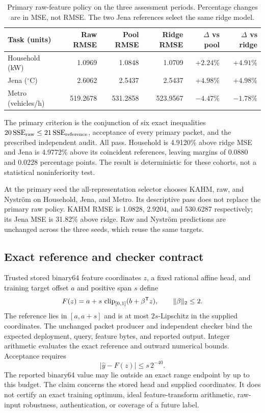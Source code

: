 \begin{table}[htbp]
\centering\small
\begin{tabular}{@{}lrrrrr@{}}
\toprule
Task (units) & Raw RMSE & Pool RMSE & Ridge RMSE & $\Delta$ vs pool & $\Delta$ vs ridge\\
\midrule
Household (kW) & 1.0969 & 1.0848 & 1.0709 & $+2.24\%$ & $+4.91\%$\\
Jena ($ {}^\circ$C) & 2.6062 & 2.5437 & 2.5437 & $+4.98\%$ & $+4.98\%$\\
Metro (vehicles/h) & 519.2678 & 531.2858 & 523.9567 & $-4.47\%$ & $-1.78\%$\\
\bottomrule
\end{tabular}
\caption{Primary raw-feature policy on the three assessment periods. Percentage changes are in MSE, not RMSE. The two Jena references select the same ridge model.}
\label{tab:accuracy}
\end{table}

The primary criterion is the conjunction of six exact inequalities
$20\,\mathrm{SSE}_{\rm raw}\leq21\,\mathrm{SSE}_{\rm reference}$,
acceptance of every primary packet, and the prescribed independent audit. All pass. Household is 4.9120\% above ridge MSE and Jena is 4.9772\% above its coincident references, leaving margins of 0.0880 and 0.0228 percentage points. The result is deterministic for these cohorts, not a statistical noninferiority test.

At the primary seed the all-representation selector chooses KAHM, raw, and Nystr\"om on Household, Jena, and Metro. Its descriptive pass does not replace the primary raw policy. KAHM RMSE is 1.0828, 2.9204, and 530.6287 respectively; its Jena MSE is 31.82\% above ridge. Raw and Nystr\"om predictions are unchanged across the three seeds, which reuse the same targets.

\subsection{Exact reference and checker contract}
Trusted stored binary64 feature coordinates $z$, a fixed rational affine head, and training target offset $a$ and positive span $s$ define
\[
F(z)=a+s\,\operatorname{clip}_{[0,1]}(b+\beta^{\mathsf T}z),
\qquad \|\beta\|_2\leq2.
\]
The reference lies in $[a,a+s]$ and is at most $2s$-Lipschitz in the supplied coordinates. The unchanged packet producer and independent checker bind the expected deployment, query, feature bytes, and reported output. Integer arithmetic evaluates the exact reference and outward numerical bounds. Acceptance requires
\[
|\widehat y-F(z)|\leq s\,2^{-40}.
\]
The reported binary64 value may lie outside an exact range endpoint by up to this budget. The claim concerns the stored head and supplied coordinates. It does not certify an exact training optimum, ideal feature-transform arithmetic, raw-input robustness, authentication, or coverage of a future label.

